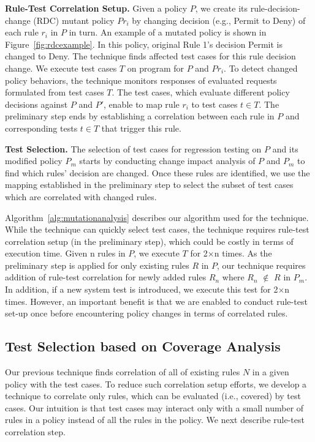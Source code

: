 \textbf{Rule-Test Correlation Setup.} Given a policy $P$, we create its rule-decision-change (RDC) mutant policy $Pr_i$ by changing decision (e.g., Permit to Deny) of each rule $r_i$ in $P$ in turn.
An example of a mutated policy is shown in Figure~\ref{fig:rdcexample}. In this policy, 
original Rule 1's decision Permit is changed to Deny. The technique finds affected test cases for this rule decision change. 
We execute test cases $T$ on program for $P$ and $Pr_i$. To detect changed policy behaviors, 
the technique monitors responses of evaluated requests formulated from test cases $T$. The test cases, which evaluate different 
policy decisions against $P$ and $P'$, enable to map rule $r_i$ to test cases $t \in T$. The preliminary step ends by establishing 
a correlation between each rule in $P$ and corresponding tests $t \in T$ that trigger this rule.

\textbf{Test Selection.} 
The selection of test cases for regression testing on $P$ and its modified policy $P_m$ starts by conducting change impact analysis 
of $P$ and $P_m$ to find which rules' decision are changed. 
Once these rules are identified, we use the mapping established in the preliminary step to select the subset of 
test cases which are correlated with changed rules.

Algorithm~\ref{alg:mutationanalysis} describes our algorithm used for the technique.
While the technique can quickly select test cases, the technique requires rule-test correlation setup 
(in the preliminary step), which could be costly in terms of execution time. Given n rules in $P$, we execute $T$ for 2$\times$n times. 
As the preliminary step is applied for only existing rules $R$ in $P$, our technique requires addition of rule-test
correlation for newly added rules $R_n$ where $R_n$ $\notin$ $R$ in $P_m$. 
In addition, if a new system test is introduced, we execute this test for 2$\times$n times.
However, an important benefit is that we are enabled to conduct rule-test set-up once before encountering policy 
changes in terms of correlated rules. 


\subsection{Test Selection based on Coverage Analysis}
Our previous technique finds correlation of all of existing rules $N$ in a given policy with the test cases. To reduce
such correlation setup efforts, we develop a technique to correlate only rules, which can be evaluated (i.e., covered)
by test cases. Our intuition is that test cases may interact only with a small number of rules in a policy
instead of all the rules in the policy. We next describe rule-test correlation step.


